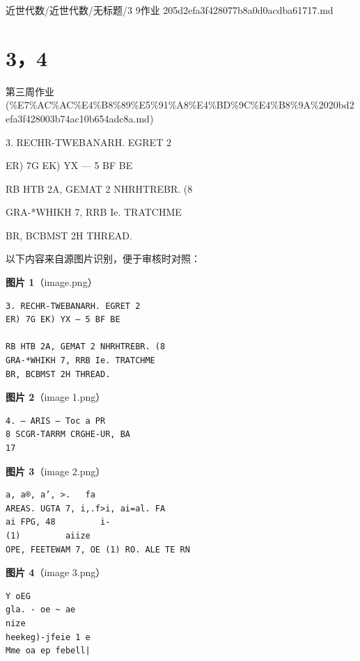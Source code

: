 \begin{note}[来源路径]

近世代数/近世代数/无标题/3 9作业 205d2efa3f428077b8a0d0acdba61717.md

\end{note}

\section*{3，4}

\begin{note}[来源上级主题]

第三周作业 (\%E7\%AC\%AC\%E4\%B8\%89\%E5\%91\%A8\%E4\%BD\%9C\%E4\%B8\%9A\%2020bd2efa3f428003b74ac10b654adc8a.md)

\end{note}

\begin{homework}

3. RECHR-TWEBANARH. EGRET 2

ER) 7G EK) YX — 5 BF BE

RB HTB 2A, GEMAT 2 NHRHTREBR. (8

GRA-*WHIKH 7, RRB Ie. TRATCHME

BR, BCBMST 2H THREAD.

\end{homework}

\begin{note}
以下内容来自源图片识别，便于审核时对照：

\textbf{图片 1}（image.png）
\begin{Verbatim}[fontsize=\small]
3. RECHR-TWEBANARH. EGRET 2
ER) 7G EK) YX — 5 BF BE

RB HTB 2A, GEMAT 2 NHRHTREBR. (8
GRA-*WHIKH 7, RRB Ie. TRATCHME
BR, BCBMST 2H THREAD.
\end{Verbatim}

\textbf{图片 2}（image 1.png）
\begin{Verbatim}[fontsize=\small]
4. — ARIS — Toc a PR
8 SCGR-TARRM CRGHE-UR, BA
17
\end{Verbatim}

\textbf{图片 3}（image 2.png）
\begin{Verbatim}[fontsize=\small]
a, a®, a’, >.   fa
AREAS. UGTA 7, i,.f>i, ai=al. FA
ai FPG, 48         i-
(1)         aiize
OPE, FEETEWAM 7, OE (1) RO. ALE TE RN
\end{Verbatim}

\textbf{图片 4}（image 3.png）
\begin{Verbatim}[fontsize=\small]
Y oEG
gla. - oe ~ ae
nize
heekeg)-jfeie 1 e
Mme oa ep febell|
\end{Verbatim}

\end{note}

